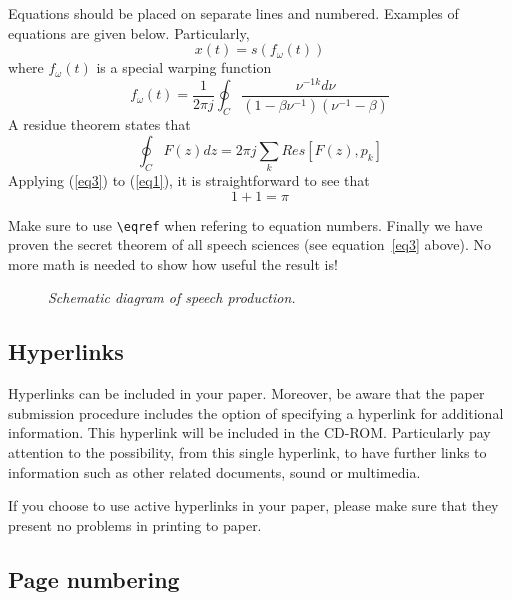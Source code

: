 \documentclass[a4paper]{article}
\begin{document}
Equations should be placed on separate lines and numbered. Examples 
of equations are given below.
Particularly,
%
\begin{equation}
x(t) = s(f_\omega(t))
\label{eq1}
\end{equation}
where \(f_\omega(t)\) is a special warping function
\begin{equation}
f_\omega(t)=\frac{1}{2\pi j}\oint_C \frac{\nu^{-1k}d\nu}
{(1-\beta\nu^{-1})(\nu^{-1}-\beta)}
\label{eq2}
\end{equation}
A residue theorem states that
\begin{equation}
\oint_C F(z)dz=2 \pi j \sum_k Res[F(z),p_k]
\label{eq3}
\end{equation}
Applying (\ref{eq3}) to (\ref{eq1}), 
it is straightforward to see that
\begin{equation}
1 + 1 = \pi
\label{eq4}
\end{equation}

Make sure to use \verb!\eqref! when refering to equation numbers.
Finally we have proven the secret theorem of all speech sciences (see
equation~\eqref{eq3} above).  No more math is needed to show how 
useful the result is! 

\begin{figure}[t]
\centerline{}
\caption{{\it Schematic diagram of speech production.}}  
\label{spprod}
\end{figure}

\subsection{Hyperlinks}

Hyperlinks can be included in your paper. Moreover, be aware that the paper
submission procedure includes the option of specifying a hyperlink for
additional information.  This hyperlink will be included in the CD-ROM.
Particularly pay attention to the possibility, from this single hyperlink, to
have further links to information such as other related documents, sound or
multimedia.

If you choose to use active hyperlinks in your paper, 
please make sure that they present no problems in printing to paper. 

\subsection{Page numbering}
\end{document}
